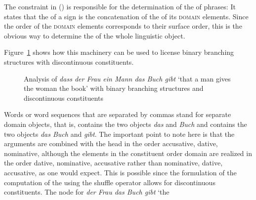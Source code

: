 \documentclass[output=paper]{langsci/langscibook}
\begin{document}
The constraint in () is responsible for the determination of the \phonvs of phrases:
\ea
{} \impl
{}
\z
It states that the \phonv of a sign is the concatenation of the \phonvs of its \textsc{domain}
elements. Since the order of the \textsc{domain} elements corresponds to their surface order, this is
the obvious way to determine the \phonv of the whole linguistic object. 

Figure~\ref{fig-the-child-reads-the-book-reape-binary} shows how this machinery can be used to license binary
branching structures with discontinuous constituents.
\begin{figure}
\caption{\label{fig-the-child-reads-the-book-reape-binary}Analysis of \emph{dass der Frau ein Mann das Buch
    gibt} `that a man gives the woman the book' with binary branching structures and discontinuous constituents}
\end{figure}%
Words or word sequences that are separated by commas stand for separate domain objects, that is,
 contains the two objects \emph{das} and \emph{Buch} and  contains the two objects \emph{das Buch} and \emph{gibt}.
The important point to note here is that the arguments are combined with the head in the order
accusative, dative, nominative, although the elements in the constituent order domain are realized in
the order dative, nominative, accusative rather than nominative, dative, accusative, as one would
expect. This is possible since the formulation of the computation of the \domv using the shuffle
operator allows for discontinuous constituents. The node for \emph{der Frau das Buch gibt} `the
\end{document}
